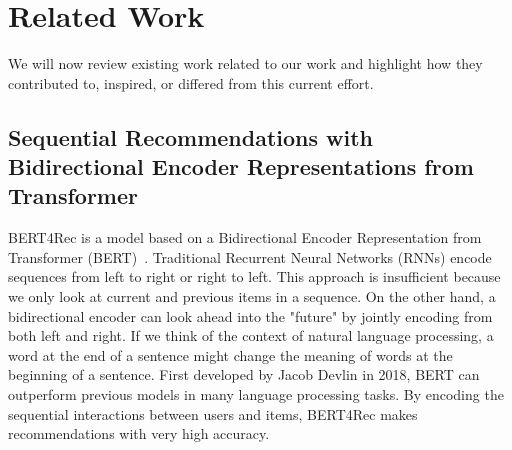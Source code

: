 \chapter{Related Work}
\label{chapter:related_work}

We will now review existing work related to our work and highlight how they contributed to, inspired, or differed from this current effort.

% 

    
    
% 
% 
% 


\section{Sequential Recommendations with Bidirectional Encoder Representations from Transformer}
BERT4Rec is a model based on a Bidirectional Encoder Representation from Transformer (BERT)~\cite{sun2019bert4rec, devlin2018bert}. Traditional Recurrent Neural Networks (RNNs) encode sequences from left to right or right to left. This approach is insufficient because we only look at current and previous items in a sequence. On the other hand, a bidirectional encoder can look ahead into the "future" by jointly encoding from both left and right. If we think of the context of natural language processing, a word at the end of a sentence might change the meaning of words at the beginning of a sentence. First developed by Jacob Devlin in 2018, BERT can outperform previous models in many language processing tasks. By encoding the sequential interactions between users and items, BERT4Rec makes recommendations with very high accuracy. 

